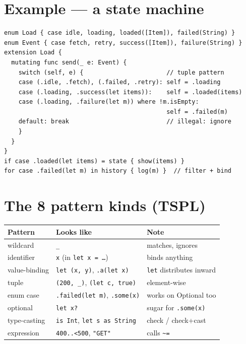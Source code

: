 \documentclass[8pt]{extarticle}
\newcommand\TL{\hbox{\textasciitilde}\hbox{=}}
\begin{document}
\begin{multicols}{2}
\section{Example — a state machine}
\begin{lstlisting}[language=SwiftSheet]
enum Load { case idle, loading, loaded([Item]), failed(String) }
enum Event { case fetch, retry, success([Item]), failure(String) }
extension Load {
  mutating func send(_ e: Event) {
    switch (self, e) {                       // tuple pattern
    case (.idle, .fetch), (.failed, .retry): self = .loading
    case (.loading, .success(let items)):    self = .loaded(items)
    case (.loading, .failure(let m)) where !m.isEmpty:
                                             self = .failed(m)
    default: break                           // illegal: ignore
    }
  }
}
if case .loaded(let items) = state { show(items) }
for case .failed(let m) in history { log(m) }  // filter + bind
\end{lstlisting}

\columnbreak

\section{The 8 pattern kinds (TSPL)}
{\footnotesize
\begin{tabular}{@{}L{17mm}L{30mm}L{27mm}@{}}
\toprule
\textbf{Pattern} & \textbf{Looks like} & \textbf{Note} \\
\midrule
wildcard & \texttt{\_} & matches, ignores \\
identifier & \texttt{x} (in \texttt{let x = \ldots}) & binds anything \\
value-binding & \texttt{let (x, y)}, \texttt{.a(let x)} & \texttt{let} distributes inward \\
tuple & \texttt{(200, \_)}, \texttt{(let c, true)} & element-wise \\
enum case & \texttt{.failed(let m)}, \texttt{.some(x)} & works on Optional too \\
optional & \texttt{let x?} & sugar for \texttt{.some(x)} \\
type-casting & \texttt{is Int}, \texttt{let s as String} & check / check+cast \\
expression & \texttt{400..<500}, \texttt{"GET"} & calls \texttt{\TL} \\
\bottomrule
\end{tabular}}


\end{multicols}
\end{document}
